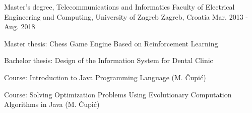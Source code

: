 

\begin{cventries}

  \cventry
    {Master's degree, Telecommunications and Informatics} %
    {Faculty of Electrical Engineering and Computing, University of Zagreb} %
    {Zagreb, Croatia} %
    {Mar. 2013 - Aug. 2018} %
    {
      \begin{cvitems} %
        \item {Master thesis: Chess Game Engine Based on Reinforcement Learning}
        \item {Bachelor thesis: Design of the Information System for Dental Clinic}
        \item {Course: Introduction to Java Programming Language (M. Čupić)}
        \item {Course: Solving Optimization Problems Using Evolutionary Computation Algorithms in Java (M. Čupić)}
      \end{cvitems}
    }

\end{cventries}
